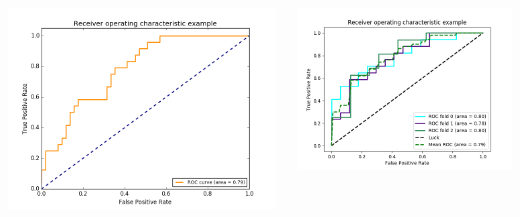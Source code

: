 \documentclass[table,dvipsnames]{beamer}
\begin{document}
\begin{frame}
\begin{columns}
\begin{column}{5cm}
\begin{center}
\includegraphics[scale=0.3]{example_roc_1.png}
\end{center}
\end{column}
\begin{column}{5cm}
\begin{center}
\includegraphics[scale=0.35]{example_roc.png}
\end{center}
\end{column}
\end{columns}
\end{frame}
\end{document}
